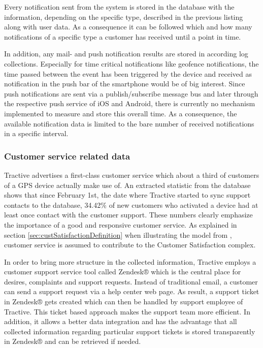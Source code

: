 Every notification sent from the system is stored in the database with the information, depending on the specific type, described in the previous listing along with user data. As a consequence it can be followed which and how many notifications of a specific type a customer has received until a point in time. 

In addition, any mail- and push notification results are stored in according log collections. 
Especially for time critical notifications like geofence notifications, the time passed between the event has been triggered by the device and received as notification in the push bar of the smartphone would be of big interest. Since push notifications are sent via a publish/subscribe message bus and later through the respective push service of iOS and Android, there is currently no mechanism implemented to measure and store this overall time. As a consequence, the available notification data is limited to the bare number of received notifications in a specific interval. 

\subsubsection{Customer service related data}
Tractive advertises a first-class customer service which about a third of customers of a GPS device actually make use of. An extracted statistic from the database shows that since February 1st, the date where Tractive started to sync support contacts to the database, 34.42\% of new customers who activated a device had at least once contact with the customer support. These numbers clearly emphasize the importance of a good and responsive customer service. As explained in section \ref{sec:custSatisfactionDefinition} when illustrating the model from \cite{johnson2001evolution}, customer service is assumed to contribute to the Customer Satisfaction complex. 

In order to bring more structure in the collected information, Tractive employs a customer support service tool called Zendesk® which is the central place for desires, complaints and support requests. Instead of traditional email, a customer can send a support request via a help center web page. As result, a support ticket in Zendesk® gets created which can then be handled by support employee of Tractive. This ticket based approach makes the support team more efficient. In addition, it allows a better data integration and has the advantage that all collected information regarding particular support tickets is stored transparently in Zendesk® and can be retrieved if needed.

